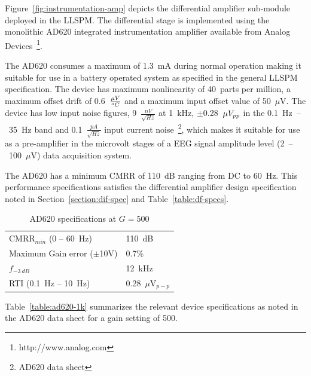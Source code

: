 Figure~\vref{fig:instrumentation-amp} depicts the differential
amplifier sub-module deployed in the LLSPM. The differential stage is
implemented using the monolithic AD620 integrated instrumentation
amplifier available from Analog
Devices~\footnote{http://www.analog.com}. 

The AD620 consumes a maximum of 1.3~mA during normal operation making
it suitable for use in a battery operated system as specified in the
general LLSPM specification. The device has maximum nonlinearity of
40~parts per million, a maximum offset drift of
0.6~$\frac{\mu\/V}{^oC}$ and a maximum input offset value of
50~$\mu$V. The device has low input noise figures,
9~$\frac{nV}{\sqrt{Hz}}$ at 1~kHz, $\pm$0.28~$\mu\/V_{pp}$ in the
0.1~Hz~--~35~Hz band and 0.1~$\frac{pA}{\sqrt{Hz}}$ input current
noise~\footnote{AD620 data sheet}, which makes it suitable for use as
a pre-amplifier in the microvolt stages of a EEG signal amplitude
level (2~--~100~$\mu$V) data acquisition system.

The AD620 has a minimum CMRR of 110~dB ranging from DC to 60~Hz. This
performance specifications satisfies the differential amplifier design
specification noted in Section~\vref{section:dif-spec} and
Table~\ref{table:df-specs}.

\begin{table}
\begin{center}	
	\begin{tabular}[htpb]{|l|l|} \hline
	CMRR$_{min}$ (0 -- 60~Hz) & 110~dB \\
	Maximum Gain error ($\pm$10V) & 0.7\% \\
	$f_{-3~dB}$ & 12~kHz \\
	RTI (0.1~Hz -- 10~Hz) & 0.28~$\mu$V$_{p-p}$ \\
	\hline
	\end{tabular}
	\caption{AD620 specifications at $G = 500$}
	\label{table:ad620-1k}
\end{center}	
\end{table}
Table~\vref{table:ad620-1k} summarizes the relevant device
specifications as noted in the AD620 data sheet for a gain setting of
500.

